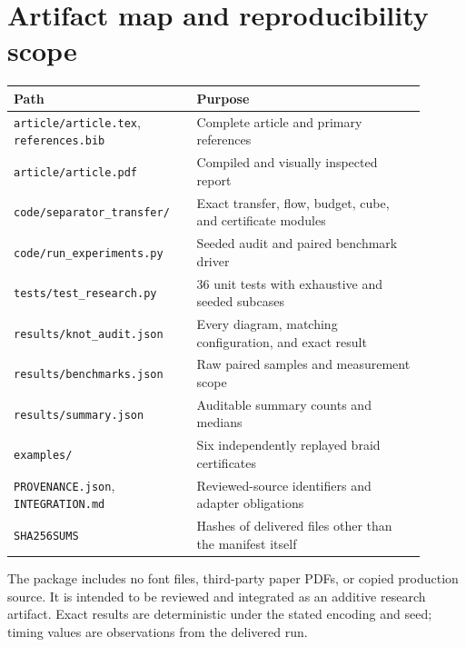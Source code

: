 \documentclass[11pt,letterpaper]{article}
\theoremstyle{definition}\newtheorem{definition}[theorem]{Definition}
\theoremstyle{remark}\newtheorem{remark}[theorem]{Remark}
\newcommand{\code}[1]{\texttt{#1}}
\begin{document}
\section{Artifact map and reproducibility scope}
\begin{center}
\begin{tabular}{p{0.39\linewidth}p{0.51\linewidth}}
\toprule
Path & Purpose\\
\midrule
\code{article/article.tex}, \code{references.bib} & Complete article and primary references\\
\code{article/article.pdf} & Compiled and visually inspected report\\
\code{code/separator\_transfer/} & Exact transfer, flow, budget, cube, and certificate modules\\
\code{code/run\_experiments.py} & Seeded audit and paired benchmark driver\\
\code{tests/test\_research.py} & 36 unit tests with exhaustive and seeded subcases\\
\code{results/knot\_audit.json} & Every diagram, matching configuration, and exact result\\
\code{results/benchmarks.json} & Raw paired samples and measurement scope\\
\code{results/summary.json} & Auditable summary counts and medians\\
\code{examples/} & Six independently replayed braid certificates\\
\code{PROVENANCE.json}, \code{INTEGRATION.md} & Reviewed-source identifiers and adapter obligations\\
\code{SHA256SUMS} & Hashes of delivered files other than the manifest itself\\
\bottomrule
\end{tabular}
\end{center}
The package includes no font files, third-party paper PDFs, or copied
production source. It is intended to be reviewed and integrated as an
additive research artifact. Exact results are deterministic under the stated
encoding and seed; timing values are observations from the delivered run.



\end{document}

